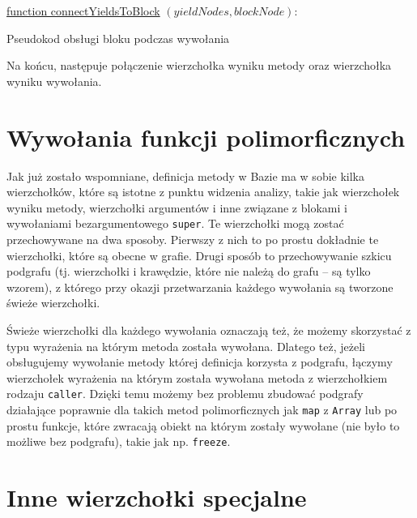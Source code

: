 \documentclass[shortabstract,mgr]{iithesis}
\newcommand{\algsize}{\small}
\begin{document}
\begin{algorithm}
    \algsize
    \underline{function connectYieldsToBlock} $(\mathit{yieldNodes}, \mathit{blockNode})$:\\
    \caption{Pseudokod obsługi bloku podczas wywołania}
    \label{alg:blocks}
\end{algorithm}


Na końcu, następuje połączenie wierzchołka wyniku metody oraz wierzchołka wyniku wywołania.


\section{Wywołania funkcji polimorficznych}

Jak już zostało wspomniane, definicja metody w Bazie ma w sobie kilka wierzchołków, które są istotne z punktu widzenia analizy, takie jak wierzchołek wyniku metody, wierzchołki argumentów i inne związane z blokami i wywołaniami bezargumentowego \texttt{super}. Te wierzchołki mogą zostać przechowywane na dwa sposoby. Pierwszy z nich to po prostu dokładnie te wierzchołki, które są obecne w grafie. Drugi sposób to przechowywanie szkicu podgrafu (tj. wierzchołki i krawędzie, które nie należą do grafu -- są tylko wzorem), z którego przy okazji przetwarzania każdego wywołania są tworzone świeże wierzchołki.

Świeże wierzchołki dla każdego wywołania oznaczają też, że możemy skorzystać z typu wyrażenia na którym metoda została wywołana. Dlatego też, jeżeli obsługujemy wywołanie metody której definicja korzysta z podgrafu, łączymy wierzchołek wyrażenia na którym została wywołana metoda z wierzchołkiem rodzaju \texttt{caller}. Dzięki temu możemy bez problemu zbudować podgrafy działające poprawnie dla takich metod polimorficznych jak \texttt{map} z \texttt{Array} lub po prostu funkcje, które zwracają obiekt na którym zostały wywołane (nie było to możliwe bez podgrafu), takie jak np. \texttt{freeze}.

\section{Inne wierzchołki specjalne}
\end{document}
